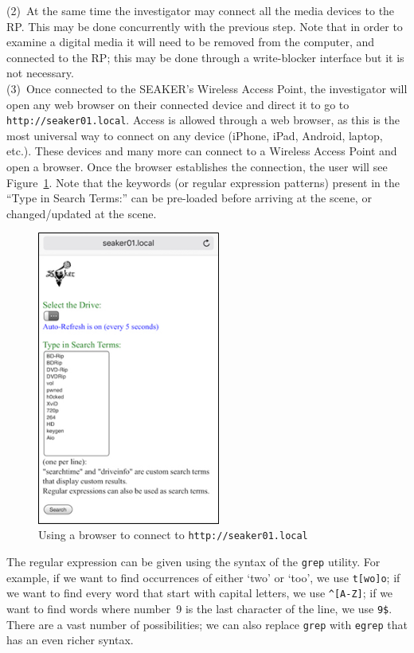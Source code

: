 \documentclass[12pt]{article}
\begin{document}
(2)~At the same time the investigator may connect all the media
devices to the RP. This may be done concurrently with the previous
step. Note that in order to examine a digital media it will need to be
removed from the
computer, and connected to the RP; this may be done through a
write-blocker interface but it is not necessary.\\

(3)~Once connected to the SEAKER's Wireless Access Point,
the investigator will open any
web browser on their connected device and direct it to go to
\verb|http://seaker01.local|. Access is allowed
through a web browser, as this is the most universal way to connect
on any device (iPhone, iPad, Android, laptop, etc.).  These
devices and many more can connect to a Wireless Access Point
and open a browser.  Once the browser establishes the
connection, the user will see Figure~\ref{fig:screen-2}. Note that the
keywords (or regular expression patterns) present in the ``Type in
Search Terms:'' can be pre-loaded before arriving at the scene, or
changed/updated at the scene.\\

\begin{figure}[H]
  \begin{center}
  \includegraphics[width=6cm]{images/seaker-hh-screen-2.jpg}
  \caption{Using a browser to connect to {\tt http://seaker01.local}}
  \label{fig:screen-2}
  \end{center}
\end{figure}

The regular expression can be given using the syntax of the
\verb|grep| utility. For example, if we want to find occurrences of
either `two' or `too', we use \verb|t[wo]o|; if we want to find every
word that start with capital letters, we use \verb|^[A-Z]|; if we want
to find words where number~9 is the last character of the line, we use
\verb|9$|. There are a vast number of possibilities; we can also
replace \verb|grep| with \verb|egrep| that has an even richer syntax.\\
\end{document}
